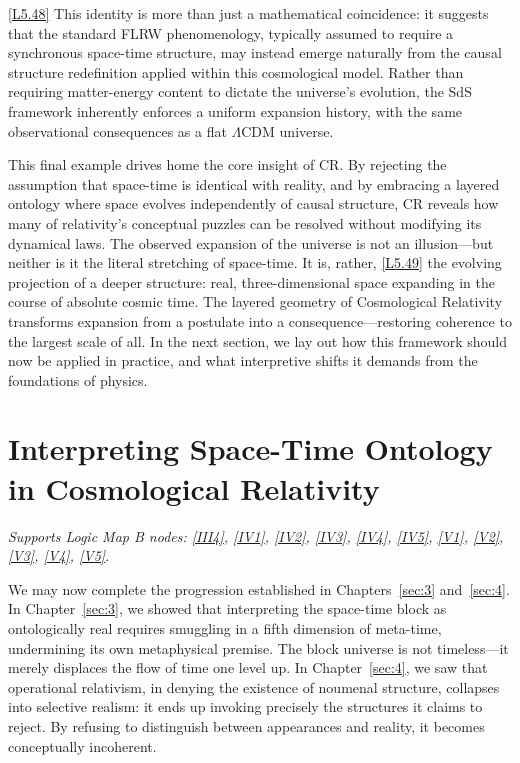 \documentclass[12pt]{book}
\newcounter{logicanchor}
\newenvironment{logicanchorenv}[1]{\refstepcounter{logicanchor}\label{#1}}{}
\newcommand{\logiclink}[2]{\begin{logicanchorenv}{logic:#1}\end{logicanchorenv}\hyperref[appendix:#1]{[#1]}\xspace}
\begin{document}
\logiclink{L5.48}{} This identity is more than just a mathematical coincidence: it suggests that the standard FLRW phenomenology, typically assumed to require a synchronous space-time structure, may instead emerge naturally from the causal structure redefinition applied within this cosmological model. Rather than requiring matter-energy content to dictate the universe's evolution, the SdS framework inherently enforces a uniform expansion history, with the same observational consequences as a flat $\Lambda$CDM universe.

This final example drives home the core insight of CR. By rejecting the assumption that space-time is identical with reality, and by embracing a layered ontology where space evolves independently of causal structure, CR reveals how many of relativity's conceptual puzzles can be resolved without modifying its dynamical laws. The observed expansion of the universe is not an illusion---but neither is it the literal stretching of space-time. It is, rather, \logiclink{L5.49}{} the evolving projection of a deeper structure: real, three-dimensional space expanding in the course of absolute cosmic time. The layered geometry of Cosmological Relativity transforms expansion from a postulate into a consequence---restoring coherence to the largest scale of all. In the next section, we lay out how this framework should now be applied in practice, and what interpretive shifts it demands from the foundations of physics.

\section[Interpreting Space-Time Ontology in CR]{Interpreting Space-Time Ontology in Cosmological Relativity}\label{sec:5.5}
\noindent\textit{Supports Logic Map B nodes: \hyperref[appendix:III4]{[III4]}, \hyperref[appendix:IV1]{[IV1]}, \hyperref[appendix:IV2]{[IV2]}, \hyperref[appendix:IV3]{[IV3]}, \hyperref[appendix:IV4]{[IV4]}, \hyperref[appendix:IV5]{[IV5]}, \hyperref[appendix:V1]{[V1]}, \hyperref[appendix:V2]{[V2]}, \hyperref[appendix:V3]{[V3]}, \hyperref[appendix:V4]{[V4]}, \hyperref[appendix:V5]{[V5]}.}

\vspace{4pt}

We may now complete the progression established in Chapters~\ref{sec:3} and~\ref{sec:4}. In Chapter~\ref{sec:3}, we showed that interpreting the space-time block as ontologically real requires smuggling in a fifth dimension of meta-time, undermining its own metaphysical premise. The block universe is not timeless---it merely displaces the flow of time one level up. In Chapter~\ref{sec:4}, we saw that operational relativism, in denying the existence of noumenal structure, collapses into selective realism: it ends up invoking precisely the structures it claims to reject. By refusing to distinguish between appearances and reality, it becomes conceptually incoherent.
\end{document}
